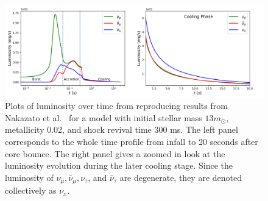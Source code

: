 \documentclass[a4paper,12pt]{article}
\begin{document}
\begin{figure}[t]
\begin{center}
\includegraphics[width=16cm]{flux_luminosity_evolution.png}
\caption{Plots of luminosity over time from reproducing results from Nakazato et al.\ \cite{Nakazato:2012qf} for a model with initial stellar mass $13m_{\odot}$, metallicity 0.02, and shock revival time 300 ms. The left panel corresponds to the whole time profile from infall to 20 seconds after core bounce. The right panel gives a zoomed in look at the luminosity evolution during the later cooling stage. Since the luminosity of $\nu_{\mu}, \bar{\nu}_{\mu}, \nu_{\tau}$, and $\bar{\nu}_{\tau}$ are degenerate, they are denoted collectively as $\nu_{x}$.} 
\label{fig:flux_sim}
\end{center}
\end{figure}
\end{document}
